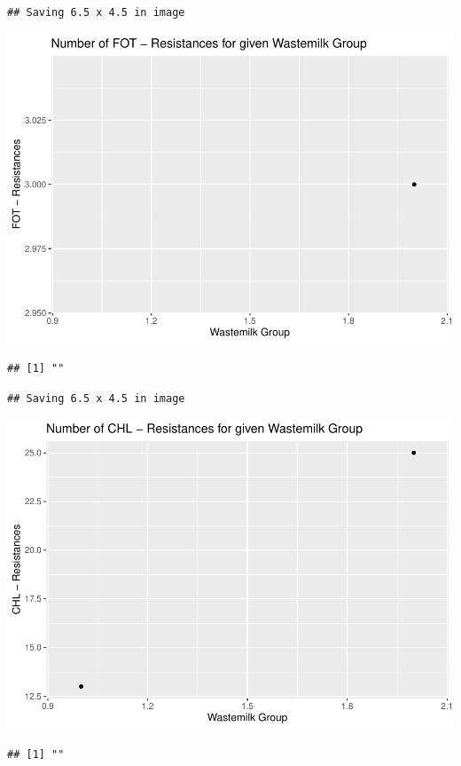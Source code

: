 \documentclass[
]{article}
\begin{document}
\begin{verbatim}
## Saving 6.5 x 4.5 in image
\end{verbatim}

\includegraphics{NResistenzen_files/figure-latex/binary_or_nominal_variables-5.pdf}

\begin{verbatim}
## [1] ""
\end{verbatim}

\begin{verbatim}
## Saving 6.5 x 4.5 in image
\end{verbatim}

\includegraphics{NResistenzen_files/figure-latex/binary_or_nominal_variables-6.pdf}

\begin{verbatim}
## [1] ""
\end{verbatim}
\end{document}
